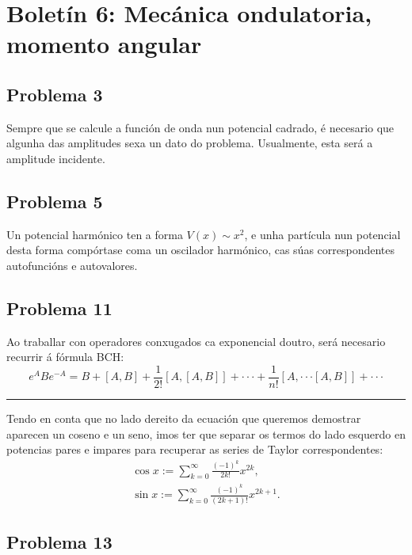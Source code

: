 \documentclass[a4paper,12pt]{article}
\begin{document}
\newpage
\section*{Boletín 6: Mecánica ondulatoria, momento angular}

\subsection*{Problema 3}

Sempre que se calcule a función de onda nun potencial cadrado, é necesario que algunha das amplitudes sexa un dato do problema. Usualmente, esta será a amplitude incidente.

\subsection*{Problema 5}

Un potencial harmónico ten a forma $V(x) \sim x^2$, e unha partícula nun potencial desta forma compórtase coma un oscilador harmónico, cas súas correspondentes autofuncións e autovalores.

\subsection*{Problema 11}

Ao traballar con operadores conxugados ca exponencial doutro, será necesario recurrir á fórmula BCH:
\begin{equation}
	e^{A} B e^{-A} = B + [A,B] + \frac{1}{2!} [A,[A,B]] + \cdot\cdot\cdot + \frac{1}{n!} [A,\cdot\cdot\cdot [A,B]] + \cdot\cdot\cdot
\end{equation}

\begin{center} \hrule \end{center}

Tendo en conta que no lado dereito da ecuación que queremos demostrar aparecen un coseno e un seno, imos ter que separar os termos do lado esquerdo en potencias pares e impares para recuperar as series de Taylor correspondentes:
\begin{equation}
\begin{gathered}
	\cos x := \sum_{k=0}^\infty \frac{(-1)^k}{2k!} x^{2k}, \\
	\sin x := \sum_{k=0}^\infty \frac{(-1)^k}{(2k+1)!} x^{2k+1}.
\end{gathered}
\end{equation}

\subsection*{Problema 13}
\end{document}
